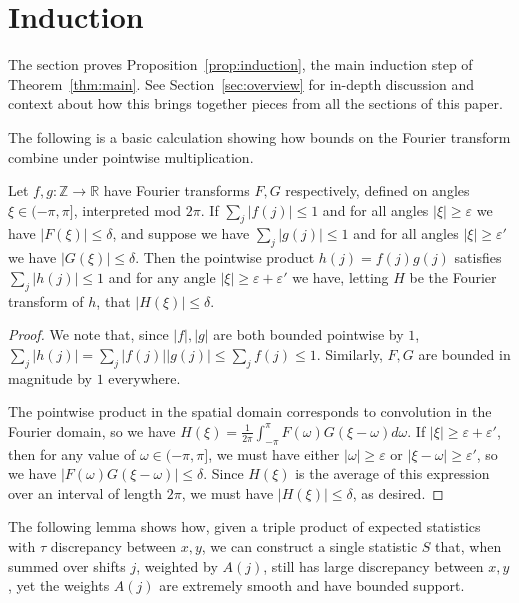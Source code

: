 \documentclass[11pt]{article}
\theoremstyle{plain}
\newcommand{\eps}{\varepsilon}
\begin{document}
\section{Induction}
\label{sec:induction} 
The section proves Proposition~\ref{prop:induction}, the main induction step of Theorem~\ref{thm:main}. See Section~\ref{sec:overview} for in-depth discussion and context about how this brings together pieces from all the sections of this paper.


The following is a basic calculation showing how bounds on the Fourier transform combine under pointwise multiplication.

\begin{lemma}\label{lem:product}
Let $f,g:\mathbb{Z}\rightarrow\mathbb{R}$ have Fourier transforms $F,G$ respectively, defined on angles $\xi\in (-\pi,\pi]$, interpreted mod $2\pi$. If $\sum_j |f(j)|\leq 1$ and for all angles $|\xi|\geq \eps$ we have $|F(\xi)|\leq \delta$, and suppose we have $\sum_j |g(j)|\leq 1$ and for all angles $|\xi|\geq \eps'$ we have $|G(\xi)|\leq \delta$. Then the pointwise product $h(j)=f(j)g(j)$ satisfies $\sum_j |h(j)|\leq 1$ and for any angle $|\xi|\geq \eps+\eps'$ we have, letting $H$ be the Fourier transform of $h$, that $|H(\xi)|\leq \delta$. 
\end{lemma}
\begin{proof}
    We note that, since $|f|,|g|$ are both bounded pointwise by $1$, $\sum_j |h(j)| = \sum_j |f(j)||g(j)| \leq \sum_j f(j) \leq 1$. Similarly, $F,G$ are bounded in magnitude by $1$ everywhere. 
    
    The pointwise product in the spatial domain corresponds to convolution in the Fourier domain, so we have $H(\xi) = \frac{1}{2\pi} \int_{-\pi}^{\pi} F(\omega)G(\xi - \omega) d\omega$. If $|\xi| \geq \eps + \eps'$, then for any value of $\omega \in (-\pi,\pi]$, we must have either $|\omega| \geq \eps$ or $|\xi - \omega| \geq \eps'$, so we have $|F(\omega)G(\xi-\omega)| \leq \delta$. Since $H(\xi)$ is the average of this expression over an interval of length $2\pi$, we must have $|H(\xi)| \leq \delta$, as desired. 
\end{proof}

The following lemma shows how, given a triple product of expected statistics with $\tau$ discrepancy between $x,y$, we can construct a single statistic $S$ that, when summed over shifts $j$, weighted by $A(j)$, still has large discrepancy between $x,y$, yet the weights $A(j)$ are extremely smooth and have bounded support.
\end{document}
